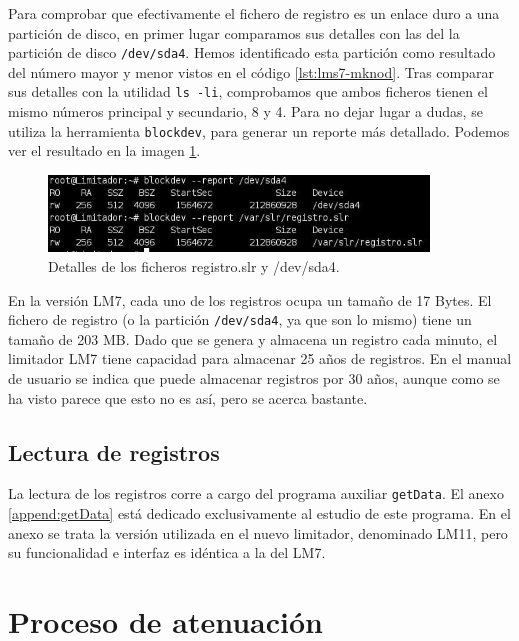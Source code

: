Para comprobar que efectivamente el fichero de registro es un enlace duro a una partición de disco, en primer lugar comparamos sus detalles con las del la partición de disco \verb|/dev/sda4|. Hemos identificado esta partición como resultado del número mayor y menor vistos en el código \ref{lst:lms7-mknod}. Tras comparar sus detalles con la utilidad \verb|ls -li|, comprobamos que ambos ficheros tienen el mismo números principal y secundario, 8 y 4. Para no dejar lugar a dudas, se utiliza la herramienta \verb|blockdev|, para generar un reporte más detallado. Podemos ver el resultado en la imagen \ref{img:registro.slr}.

\begin{figure}[h]
    \centering
    \includegraphics[width=0.9\textwidth]{imagenes/lms7-registro-slr.jpg}
    \caption{Detalles de los ficheros registro.slr y /dev/sda4.}
    \label{img:registro.slr}
\end{figure}

En la versión \acrshort{LM7}, cada uno de los registros ocupa un tamaño de 17 Bytes. El fichero de registro (o la partición \verb|/dev/sda4|, ya que son lo mismo) tiene un tamaño de 203 MB. Dado que se genera y almacena un registro cada minuto, el limitador \acrshort{LM7} tiene capacidad para almacenar 25 años de registros. En el manual de usuario se indica que puede almacenar registros por 30 años, aunque como se ha visto parece que esto no es así, pero se acerca bastante.

\subsection{Lectura de registros}

La lectura de los registros corre a cargo del programa auxiliar \verb|getData|. El anexo \ref{append:getData} está dedicado exclusivamente al estudio de este programa. En el anexo se trata la versión utilizada en el nuevo limitador, denominado \acrshort{LM11}, pero su funcionalidad e interfaz es idéntica a la del \acrshort{LM7}.


\section{Proceso de atenuación}

